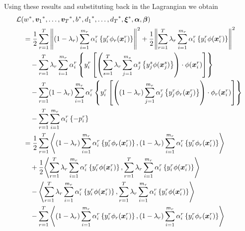 Using these results and substituting back in the Lagrangian we obtain
\begin{equation}\nonumber
    \begin{aligned}
        & \lagr(\optim{{w}}, \optim{\fv{v}_1}, \ldots, \optim{\fv{v}_\ntasks}, \optim{b}, \optim{d_1}, \ldots, \optim{d_\ntasks}, \optim{\fv{\xi}}, \fv{\alpha}, \fv{\beta})\\
        &\quad=  \frac{1}{2} \sum_{r= 1}^T{\norm{ (1 - \lambda_r) \sum_{i=1}^{m_r}  {\alpha_i^r} \left\lbrace y_i^r \phi_r(\fv{x}_i^r) \right\rbrace}^2} + \frac{1}{2} {\norm{\sum_{r= 1}^T \lambda_r \sum_{i=1}^{m_r} {\alpha_i^r} \left\lbrace y_i^r \phi(\fv{x}_i^r) \right\rbrace}}^2 \\
        &\qquad - \sum_{r= 1}^T \lambda_r \sum_{i=1}^{m_r} \alpha_i^r \left\lbrace y_{i}^r \left[ \left(\sum_{s= 1}^T \lambda_r \sum_{j=1}^{m_s} {\alpha_j^s} \left\lbrace y_j^s \phi(\fv{x}_j^s) \right\rbrace \right) \cdot \phi(\fv{x}_{i}^r) \right]  \right\rbrace \\
        &\qquad -  \sum_{r= 1}^T (1-\lambda_r) \sum_{i=1}^{m_r} \alpha_i^r \left\lbrace y_{i}^r \left[  \left((1-\lambda_r) \sum_{j=1}^{m_r} {\alpha_j^r} \left\lbrace y_j^r \phi_r(\fv{x}_j^r) \right\rbrace \right) \cdot \phi_r(\fv{x}_{i}^r)  \right]  \right\rbrace \\
        &\qquad -  \sum_{r= 1}^T \sum_{i=1}^{m_r} \alpha_i^r \left\lbrace - p_{i}^r  \right\rbrace \\
        &\quad=  \frac{1}{2} \sum_{r= 1}^T{\dotp{(1-\lambda_r)\sum_{i=1}^{m_r} {\alpha_i^r} \left\lbrace y_i^r \phi_r(\fv{x}_i^r) \right\rbrace}{(1-\lambda_r)\sum_{i=1}^{m_r} {\alpha_i^r} \left\lbrace y_i^r \phi_r(\fv{x}_i^r) \right\rbrace}} \\
        &\qquad + \frac{1}{2} {\dotp{\sum_{r= 1}^\ntasks \lambda_r \sum_{i=1}^{m_r} {\alpha_i^r} \left\lbrace y_i^r \phi(\fv{x}_i^r) \right\rbrace}{\sum_{r= 1}^\ntasks \lambda_r \sum_{i=1}^{m_r} {\alpha_i^r} \left\lbrace y_i^r \phi(\fv{x}_i^r) \right\rbrace}} \\
        &\qquad - \dotp{ \sum_{r= 1}^T \lambda_r \sum_{i=1}^{m_r} {\alpha_i^r} \left\lbrace y_i^r \phi(\fv{x}_i^r) \right\rbrace}{ \sum_{r= 1}^T \lambda_r \sum_{i=1}^{m_r} {\alpha_i^r} \left\lbrace y_i^r \phi(\fv{x}_i^r) \right\rbrace} \\
        &\qquad -  \sum_{r= 1}^T {\dotp{(1-\lambda_r) \sum_{i=1}^{m_r} {\alpha_i^r} \left\lbrace y_i^r \phi_r(\fv{x}_i^r) \right\rbrace}{(1-\lambda_r) \sum_{i=1}^{m_r} {\alpha_i^r} \left\lbrace y_i^r \phi_r(\fv{x}_i^r) \right\rbrace}} \\

\end{aligned}
\end{equation}
